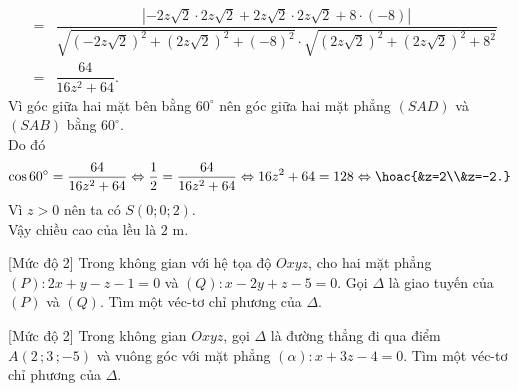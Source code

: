 \begin{bt}
{\begin{eqnarray*}
			&=&\dfrac{|-2z\sqrt{2}\cdot 2z\sqrt{2}+2z\sqrt{2}\cdot 2z\sqrt{2}+8\cdot(-8)|}{\sqrt{(-2z\sqrt{2})^2+(2z\sqrt{2})^2+(-8)^2}\cdot \sqrt{(2z\sqrt{2})^2+(2z\sqrt{2})^2+8^2}}\\
			&=&\dfrac{64}{16z^2+64}.
		\end{eqnarray*}
		Vì góc giữa hai mặt bên bằng $60^{\circ}$ nên góc giữa hai mặt phẳng $(SAD)$ và $(SAB)$ bằng $60^{\circ}$.\\
		Do đó
		$$\cos 60^{\circ}=\dfrac{64}{16z^2+64} \Leftrightarrow \dfrac{1}{2}=\dfrac{64}{16z^2+64}\Leftrightarrow 16z^2+64=128\Leftrightarrow \hoac{&z=2\\&z=-2.}$$
		Vì $z>0$ nên ta có $S(0;0;2)$.\\
		Vậy chiều cao của lều là $2$ m.
	}
\end{bt}

\begin{bt}%
[Mức độ 2]
	Trong không gian với hệ tọa độ $Oxyz$, cho hai mặt phẳng $(P)\colon 2x+y-z-1=0$ và $(Q)\colon x-2y+z-5=0$. Gọi $\Delta$ là giao tuyến của $(P)$ và $(Q)$. Tìm một véc-tơ chỉ phương của $\Delta$.
\end{bt}

\begin{bt}%
[Mức độ 2]
	Trong không gian $Oxyz$, gọi $\Delta$ là đường thẳng đi qua điểm $A( 2\,;3\,;-5 )$ và vuông góc với mặt phẳng $( \alpha ):x+3z-4=0$. Tìm một véc-tơ chỉ phương của $\Delta$.
\end{bt}

